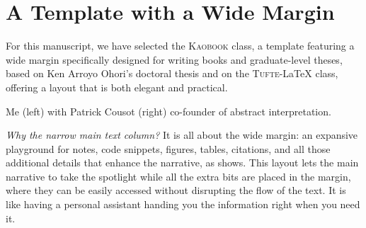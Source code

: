 \def\customcitkey{}\def\absintkey{}


\chapter*{A Template with a Wide Margin}

For this manuscript, we have selected the \textsc{Kaobook} class, a template featuring a wide margin specifically designed for writing books and graduate-level theses, based on Ken Arroyo Ohori's doctoral thesis and on the \textsc{Tufte}-\LaTeX{} class, offering a layout that is both elegant and practical.

\marginnote{\formatmargincitation{\absintkey}}
\newcommand*{\ClipSep}{0.5cm}
\begin{marginfigure}
  \centering
  \hspace*{-\ClipSep}
    \vspace*{-\ClipSep}
  \caption{Me (left) with Patrick Cousot (right) co-founder of abstract interpretation\cite{\absintkey}.}
\end{marginfigure}

\emph{Why the narrow main text column?} It is all about the wide margin: an expansive playground for notes, code snippets, figures, tables, citations, and all those additional details that enhance the narrative, as  shows.
This layout lets the main narrative to take the spotlight while all the extra bits are placed in the margin, where they can be easily accessed without disrupting the flow of the text. It is like having a personal assistant handing you the information right when you need it.


